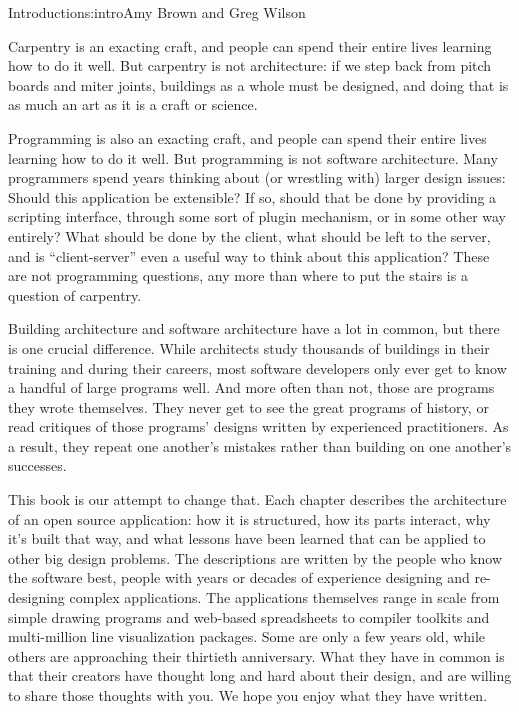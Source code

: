 \begin{aosachapter}{Introduction}{s:intro}{Amy Brown and Greg Wilson}

Carpentry is an exacting craft, and people can spend their entire
lives learning how to do it well.  But carpentry is not architecture:
if we step back from pitch boards and miter joints, buildings as a
whole must be designed, and doing that is as much an art as it is a
craft or science.

Programming is also an exacting craft, and people can spend their entire lives
learning how to do it well.  But programming is not software architecture. 
Many programmers spend years thinking about
(or wrestling with) larger design issues: Should this application be
extensible?  If so, should that be done by providing a scripting
interface, through some sort of plugin mechanism, or in some other way
entirely?  What should be done by the client, what should be left to
the server, and is ``client-server'' even a useful way to think about
this application?  These are not programming questions, any more than
where to put the stairs is a question of carpentry.

Building architecture and software architecture have a lot in common,
but there is one crucial difference.  While architects study
thousands of buildings in their training and during their careers,
most software developers only ever get to know a handful of large
programs well.  And more often than not, those are programs they wrote
themselves.  They never get to see the great programs of history, or
read critiques of those programs' designs written by experienced
practitioners.  As a result, they repeat one another's mistakes rather
than building on one another's successes.

This book is our attempt to change that.  Each chapter describes the
architecture of an open source application: how it is structured, how
its parts interact, why it's built that way, and what lessons have
been learned that can be applied to other big design problems.  The
descriptions are written by the people who know the software
best, people with years or decades of experience designing and
re-designing complex applications.  The applications themselves range
in scale from simple drawing programs and web-based spreadsheets to
compiler toolkits and multi-million line visualization packages.  Some
are only a few years old, while others are approaching their thirtieth
anniversary.  What they have in common is that their creators have
thought long and hard about their design, and are willing to share
those thoughts with you.  We hope you enjoy what they have written.


\end{aosachapter}
